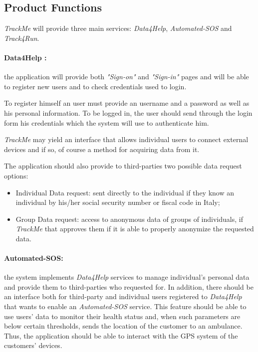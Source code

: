 \documentclass[a4paper]{article}
\begin{document}
    \subsection{Product Functions}
    \textit{TrackMe} will provide three main services: \textit{Data4Help}, \textit{Automated-SOS} and \textit{Track4Run}.
    
    \paragraph{Data4Help :}
    the application will provide both \textit{"Sign-on"} and \textit{"Sign-in"} pages and will be able to register new users and to check credentials used to login.
    
    To register himself an user must provide an username and a password as well as his personal information. To be logged in, the user should send through the login form his credentials which the system will use to authenticate him.
    
    \textit{TrackMe} may yield an interface that allows individual users to connect external devices and if so, of course a method for acquiring data from it.
    
    The application should also provide to third-parties two possible data request options:
    \begin{itemize}
        \item Individual Data request: sent directly to the individual if they know an  individual by his/her social security number or fiscal code in Italy;
        \item Group Data request: access  to  anonymous  data  of  groups  of  individuals, if \textit{TrackMe}  that  approves  them  if  it  is  able  to  properly  anonymize  the  requested  data.
    \end{itemize}
    
    \paragraph{Automated-SOS:} the system implements \textit{Data4Help} services to manage individual's personal data and provide them to third-parties who requested for. In addition, there should be an interface both for third-party and individual users registered to \textit{Data4Help} that wants to enable an \textit{Automated-SOS} service. This feature should be able to use users' data to monitor their health status and, when such parameters are below certain thresholds, sends the location of the customer to an ambulance. Thus, the application should be able to interact with the GPS system of the customers' devices.
    
\end{document}

